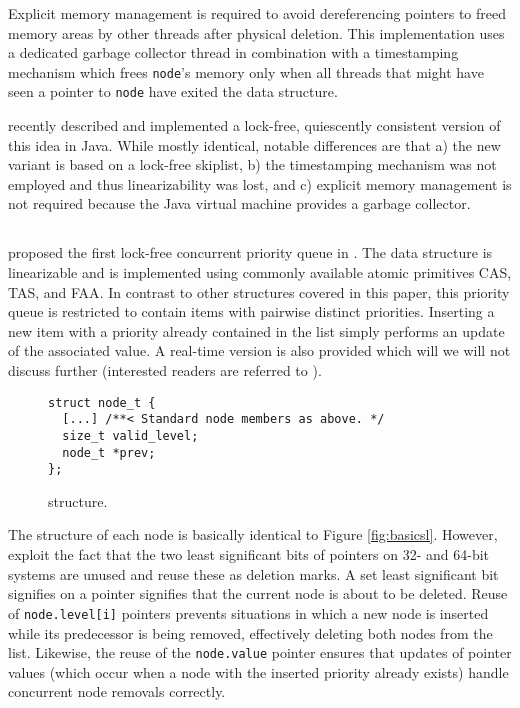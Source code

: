 \documentclass[a4paper,10pt]{article}
\begin{document}

Explicit memory management is required to avoid dereferencing pointers to freed memory areas
by other threads after physical deletion. This implementation uses a dedicated garbage collector
thread in combination with a timestamping mechanism which frees \lstinline|node|'s memory only
when all threads that might have seen a pointer to \lstinline|node| have exited the data structure.

\citeauthor{herlihy2012art} \cite{herlihy2012art} recently described and implemented a lock-free,
quiescently consistent version of this idea in Java. While mostly identical, notable differences are
that a) the new variant is based on a lock-free skiplist, b) the timestamping mechanism was not
employed and thus linearizability was lost, and c) explicit memory management is not required
because the Java virtual machine provides a garbage collector.

\subsection{\citeauthor{sundell2003fast}} \label{sec:sundell}

\citeauthor{sundell2003fast} proposed the first lock-free concurrent priority queue in
\citeyear{sundell2003fast} \cite{sundell2003fast}. The data structure is linearizable
and is implemented using commonly available atomic primitives \ac{CAS}, \ac{TAS}, and \ac{FAA}.
In contrast to other structures covered in this paper, this priority queue is restricted to
contain items with pairwise distinct priorities. Inserting a new item with a priority already contained
in the list simply performs an update of the associated value.
A real-time version is also provided which will we will not discuss further (interested readers are
referred to \cite{sundell2003fast}).

\begin{figure}[ht]
\begin{lstlisting}
struct node_t {
  [...] /**< Standard node members as above. */
  size_t valid_level;
  node_t *prev;
};
\end{lstlisting}
\caption{\citeauthor{sundell2003fast} structure.}
\label{fig:sundellsl}
\end{figure}

The structure of each node is basically identical to Figure \ref{fig:basicsl}. However, \citeauthor{sundell2003fast}
exploit the fact that the two least significant bits of pointers on 32- and 64-bit systems
are unused and reuse these as deletion marks. A set least significant bit signifies on a pointer signifies
that the current node is about to be deleted.
Reuse of \lstinline|node.level[i]| pointers
prevents situations in which a new node is inserted while its predecessor is being removed,
effectively deleting both nodes from the list. Likewise, the reuse of the \lstinline|node.value|
pointer ensures that updates of pointer values (which occur when a node with the inserted priority already exists)
handle concurrent node removals correctly.
\end{document}
